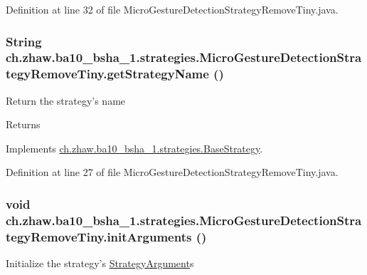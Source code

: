 Definition at line 32 of file MicroGestureDetectionStrategyRemoveTiny.java.\hypertarget{classch_1_1zhaw_1_1ba10__bsha__1_1_1strategies_1_1MicroGestureDetectionStrategyRemoveTiny_a95ac0cb1ddbc1a667e2b5c2dd05dbcdf}{
\subsubsection[{getStrategyName}]{\setlength{\rightskip}{0pt plus 5cm}String ch.zhaw.ba10\_\-bsha\_\-1.strategies.MicroGestureDetectionStrategyRemoveTiny.getStrategyName ()}}
\label{classch_1_1zhaw_1_1ba10__bsha__1_1_1strategies_1_1MicroGestureDetectionStrategyRemoveTiny_a95ac0cb1ddbc1a667e2b5c2dd05dbcdf}
Return the strategy's name

\begin{DoxyReturn}{Returns}

\end{DoxyReturn}


Implements \hyperlink{classch_1_1zhaw_1_1ba10__bsha__1_1_1strategies_1_1BaseStrategy_aa0ebed55eed45409bad13d43a0058780}{ch.zhaw.ba10\_\-bsha\_\-1.strategies.BaseStrategy}.

Definition at line 27 of file MicroGestureDetectionStrategyRemoveTiny.java.\hypertarget{classch_1_1zhaw_1_1ba10__bsha__1_1_1strategies_1_1MicroGestureDetectionStrategyRemoveTiny_a610257a043f76cbc8b9a886e5efb8135}{
\subsubsection[{initArguments}]{\setlength{\rightskip}{0pt plus 5cm}void ch.zhaw.ba10\_\-bsha\_\-1.strategies.MicroGestureDetectionStrategyRemoveTiny.initArguments ()}}
\label{classch_1_1zhaw_1_1ba10__bsha__1_1_1strategies_1_1MicroGestureDetectionStrategyRemoveTiny_a610257a043f76cbc8b9a886e5efb8135}
Initialize the strategy's \hyperlink{classch_1_1zhaw_1_1ba10__bsha__1_1_1StrategyArgument}{StrategyArgument}s 

